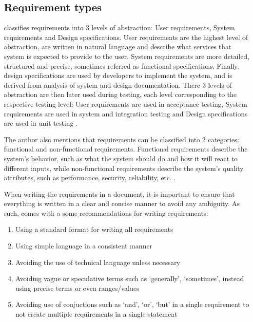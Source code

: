 \subsection{Requirement types}

\textcite[4]{requirements} classifies requirements into 3 levels of abstraction: User requirements, System requirements and Design specifications. User requirements are the highest level of abstraction, are written in natural language and describe what services that system is expected to provide to the user. System requirements are more detailed, structured and precise, sometimes referred as functional specifications. Finally, design specifications are used by developers to implement the system, and is derived from analysis of system and design documentation. There 3 levels of abstraction are then later used during testing, each level corresponding to the respective testing level: User requirements are used in acceptance testing, System requirements are used in system and integration testing and Design specifications are used in unit testing \parencite[4]{requirements}.

The author also mentions that requirements can be classified into 2 categories: functional and non-functional requirements. Functional requirements describe the system's behavior, such as what the system should do and how it will react to different inputs, while non-functional requirements describe the system's quality attributes, such as performance, security, reliability, etc. \parencite[6]{requirements}.

When writing the requirements in a document, it is important to ensure that everything is written in a clear and concise manner to avoid any ambiguity. As such, \textcite[112]{requirements} comes with a some recommendations for writing requirements:
\begin{enumerate}
    \item Using a standard format for writing all requirements
    \item Using simple language in a consistent manner
    \item Avoiding the use of technical language unless necessary
    \item Avoiding vague or speculative terms such as `generally', `sometimes', instead using precise terms or even ranges/values
    \item Avoiding use of conjuctions such as `and', `or', `but' in a single requirement to not create multiple requirements in a single statement
\end{enumerate}

